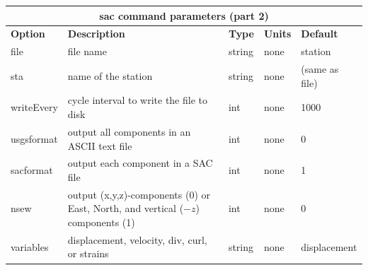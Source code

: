 \documentclass[11pt]{report}
\begin{document}
\begin{center}
\begin{tabular}{|l|p{8cm}|l|l|l|} \hline
\multicolumn{5}{|c|}{\bf sac command parameters (part 2)}\\ \hline
\bf{Option} & \bf{Description} & \bf{Type} & \bf{Units} & \bf{Default} \\ \hline \hline
file & file name  & string & none & station \\ \hline
sta & name of the station & string & none & (same as file) \\ \hline
writeEvery & cycle interval to write the file to disk & int & none & 1000 \\ \hline
%
usgsformat & output all components in an ASCII text file & int & none & 0 \\ \hline
sacformat & output each component in a SAC file & int & none & 1 \\ \hline 
\hline
nsew & output (x,y,z)-components (0) or East, North, and vertical ($-z$) components (1)& int & none & 0 \\ \hline
variables & displacement, velocity, div, curl, or strains & string & none & displacement \\ \hline
\end{tabular}
\end{center}

\end{document}
